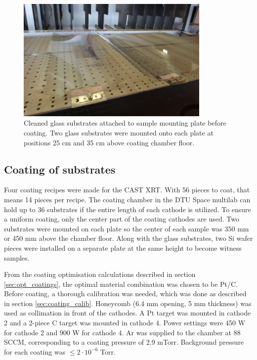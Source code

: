 \begin{figure}[htbp]
  \centering
    \includegraphics[height=6cm]{figures/cast/coating_mount.jpg}
  \caption{\footnotesize Cleaned glass substrates attached to sample mounting plate before coating. Two glass substrates were mounted onto each plate at positions 25 cm and 35 cm above coating chamber floor.}
  \label{fig:coating_mount}
\end{figure}

\subsection{Coating of substrates}
Four coating recipes were made for the CAST XRT. With 56 pieces to coat, that means 14 pieces per recipe. The  coating chamber in the DTU Space multilab can hold up to 36 substrates if the entire length of each cathode is utilized. To ensure a uniform coating, only the center part of the coating cathodes are used. Two substrates were mounted on each plate so the center of each sample was 350 mm or 450 mm above the chamber floor. Along with the glass substrates, two Si wafer pieces were installed on a separate plate at the same height to become witness samples.

From the coating optimisation calculations described in section \ref{sec:opt_coatings}, the optimal material combination was chosen to be Pt/C. Before coating, a thorough calibration was needed, which was done as described in section \ref{sec:coating_calib}. Honeycomb (6.4 mm opening, 5 mm thickness) was used as collimation in front of the cathodes. A Pt target was mounted in cathode 2 and a 2-piece C target was mounted in cathode 4. Power settings were 450 W for cathode 2 and 900 W for cathode 4. Ar was supplied to the chamber at 88 SCCM, corresponding to a coating pressure of 2.9 mTorr. Background pressure for each coating was $\leq 2\cdot10^{-6}$ Torr.

